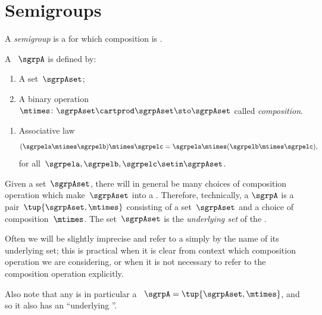 
\section{Semigroups}
\label{sec:semigroups}
A \emph{semigroup} is a  for which composition is .



\begin{marginfigure}
    \centering
    \caption{Semigroup Commutative Diagram}
    \label{fig:semigroup-commutative-diagram}
\end{marginfigure}

\begin{ctdefinition}[Semigroup]
    \label{def:semigroup}
    A ~$\sgrpA$ is defined by:
    \begin{body}
        \constit
        \begin{enumerate}
            \item A set~$\sgrpAset$;
            \item A binary operation~$\mtimes \colon \sgrpAset \cartprod \sgrpAset \sto \sgrpAset$ called \emph{composition}.
        \end{enumerate}
        \condit
        \begin{enumerate}
            \item Associative law
                  \begin{equation}
                      \label{eq:semigroup-associative}
                      (\sgrpela \mtimes   \sgrpelb)\mtimes   \sgrpelc
                      = \sgrpela \mtimes   (\sgrpelb \mtimes  \sgrpelc),
                  \end{equation}
                  for all~$\sgrpela, \sgrpelb, \sgrpelc \setin \sgrpAset$.
        \end{enumerate}
    \end{body}
\end{ctdefinition}

\begin{remark}
    Given a set~$\sgrpAset$, there will in general be many choices of composition operation which make~$\sgrpAset$ into a .
    Therefore, technically, a  $\sgrpA$ is a pair~$\tup{\sgrpAset, \mtimes}$ consisting of a set~$\sgrpAset$ and a choice of composition~$\mtimes$.
    The set~$\sgrpAset$ is the \emph{underlying set} of the .

    Often we will be slightly imprecise and refer to a  simply by the name of its underlying set;
    this is practical when it is clear from context which composition operation we are considering, or when it is not necessary to refer to the composition operation explicitly.

    Also note that any  is in particular a ~$\sgrpA = \tup{\sgrpAset,\mtimes}$, and so it also has an ``underlying ''.
\end{remark}

